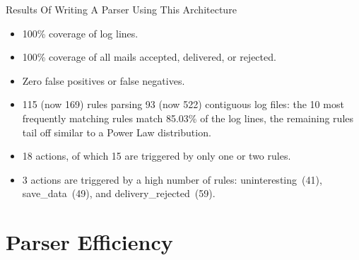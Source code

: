 \documentclass{beamer}
\newcommand{\timingnote}[1]{%
}
\begin{document}
\begin{frame}{Results Of Writing A Parser Using This Architecture}

    \timingnote{1--2 minutes}

    \begin{itemize}

        \item 100\% coverage of log lines.

        \item 100\% coverage of all mails accepted, delivered, or rejected.

        \item Zero false positives or false negatives.

        \item 115 (now 169) rules parsing 93 (now 522) contiguous log
            files: the 10 most frequently matching rules match 85.03\% of
            the log lines, the remaining rules tail off similar to a Power
            Law distribution.

        \item 18 actions, of which 15 are triggered by only one or two
            rules.  \timingnote{client connecting, postfix reloading}

        \item 3 actions are triggered by a high number of rules:
            uninteresting~(41), save\_data~(49), and
            delivery\_rejected~(59).

    \end{itemize}

\end{frame}

\section{Parser Efficiency}
\end{document}
